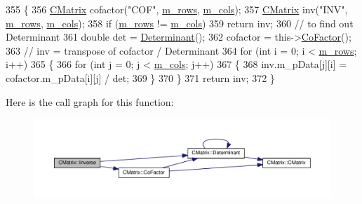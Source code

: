 \begin{DoxyCode}
355         \{
356             \hyperlink{classCMatrix}{CMatrix} cofactor(\textcolor{stringliteral}{"COF"}, \hyperlink{classCMatrix_ae23e5f8016ba06cfd1cce364a99f5037}{m\_rows}, \hyperlink{classCMatrix_a723f752208c055093012984eaddb62d3}{m\_cols});
357             \hyperlink{classCMatrix}{CMatrix} inv(\textcolor{stringliteral}{"INV"}, \hyperlink{classCMatrix_ae23e5f8016ba06cfd1cce364a99f5037}{m\_rows}, \hyperlink{classCMatrix_a723f752208c055093012984eaddb62d3}{m\_cols});
358             \textcolor{keywordflow}{if} (\hyperlink{classCMatrix_ae23e5f8016ba06cfd1cce364a99f5037}{m\_rows} != \hyperlink{classCMatrix_a723f752208c055093012984eaddb62d3}{m\_cols})
359                 \textcolor{keywordflow}{return} inv;
360             \textcolor{comment}{// to find out Determinant}
361             \textcolor{keywordtype}{double} det = \hyperlink{classCMatrix_a865ff8f610be372e666fbf24d5b73a3a}{Determinant}();
362             cofactor = this->\hyperlink{classCMatrix_acc5e18f7dac42418762e92ebd8d10840}{CoFactor}();
363             \textcolor{comment}{// inv = transpose of cofactor / Determinant}
364             \textcolor{keywordflow}{for} (\textcolor{keywordtype}{int} i = 0; i < \hyperlink{classCMatrix_ae23e5f8016ba06cfd1cce364a99f5037}{m\_rows}; i++)
365             \{
366                 \textcolor{keywordflow}{for} (\textcolor{keywordtype}{int} j = 0; j < \hyperlink{classCMatrix_a723f752208c055093012984eaddb62d3}{m\_cols}; j++)
367                 \{
368                     inv.m\_pData[j][i] = cofactor.m\_pData[i][j] / det;
369                 \}
370             \}
371             \textcolor{keywordflow}{return} inv;
372         \}
\end{DoxyCode}


Here is the call graph for this function\+:
\nopagebreak
\begin{figure}[H]
\begin{center}
\leavevmode
\includegraphics[width=350pt]{classCMatrix_abd58298df23c98b8675a81a70c6f140b_cgraph}
\end{center}
\end{figure}


